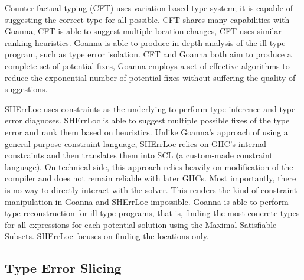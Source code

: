    Counter-factual typing (CFT) \cite{Chen2014-dz,Chen2020-ad} uses variation-based type system; it is capable of suggesting the correct type for all possible. CFT shares many capabilities with Goanna, CFT is able to suggest multiple-location changes, CFT uses similar ranking heuristics. Goanna is able to produce in-depth analysis of the ill-type program, such as type error isolation. CFT and Goanna both aim to produce a complete set of potential fixes, Goanna employs a set of effective algorithms to reduce the exponential number of potential fixes without suffering the quality of suggestions. 
   
   SHErrLoc \cite{Zhang2015-xy} uses constraints as the underlying to perform type inference and type error diagnoses. SHErrLoc is able to suggest multiple possible fixes of the type error and rank them based on heuristics. Unlike Goanna's approach of using a general purpose constraint language, SHErrLoc relies on GHC's internal constraints and then translates them into SCL (a custom-made constraint language). On technical side, this approach relies heavily on modification of the compiler and does not remain reliable with later GHCs. Most importantly, there is no way to directly interact with the solver. This renders the kind of constraint manipulation in Goanna and SHErrLoc impossible. Goanna is able to perform type reconstruction for ill type programs, that is, finding the most concrete types for all expressions for each potential solution using the Maximal Satisfiable Subsets. SHErrLoc focuses on finding the locations only.


\subsection{Type Error Slicing}


